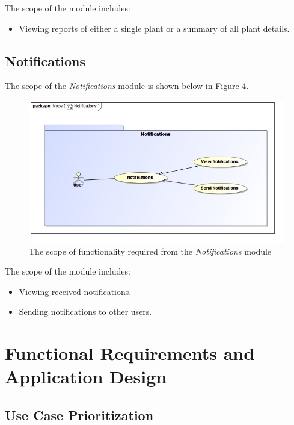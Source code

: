 \documentclass{article}
\begin{document}
		The scope of the \emph{} module includes:
		
		\begin{itemize}
			\item Viewing reports of either a single plant or a summary of all plant details.
		\end{itemize}
		
	\pagebreak
	\subsection{Notifications}
		The scope of the \emph{Notifications} module is shown below in Figure 4.
		
		\begin{figure}[H]
			\centering
			\includegraphics[width=\textwidth]{../software-architecture-specification/Notifications.jpg}
			\caption{The scope of functionality required from the \emph{Notifications} module}
		\end{figure}
		
		The scope of the \emph{} module includes:
		
		\begin{itemize}
			\item Viewing received notifications.
			\item Sending notifications to other users.
		\end{itemize}

\section{Functional Requirements and Application Design}
	\subsection{Use Case Prioritization}
\end{document}
